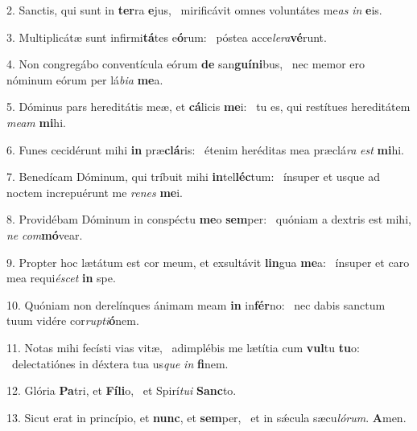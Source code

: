 2. Sanctis, qui sunt in \textbf{ter}ra \textbf{e}jus, \ast\  mirificávit omnes voluntátes me\textit{as} \textit{in} \textbf{e}is.\

3. Multiplicátæ sunt infirmi\textbf{tá}tes e\textbf{ó}rum: \ast\  póstea acce\textit{le}\textit{ra}\textbf{vé}runt.\

4. Non congregábo conventícula eórum \textbf{de} san\textbf{guí}\textbf{ni}bus, \ast\  nec memor ero nóminum eórum per lá\textit{bi}\textit{a} \textbf{me}a.\

5. Dóminus pars hereditátis meæ, et \textbf{cá}licis \textbf{me}i: \ast\  tu es, qui restítues hereditátem \textit{me}\textit{am} \textbf{mi}hi.\

6. Funes cecidérunt mihi \textbf{in} præ\textbf{clá}ris: \ast\  étenim heréditas mea præclá\textit{ra} \textit{est} \textbf{mi}hi.\

7. Benedícam Dóminum, qui tríbuit mihi \textbf{in}tel\textbf{léc}tum: \ast\  ínsuper et usque ad noctem increpuérunt me \textit{re}\textit{nes} \textbf{me}i.\

8. Providébam Dóminum in conspéctu \textbf{me}o \textbf{sem}per: \ast\  quóniam a dextris est mihi, \textit{ne} \textit{com}\textbf{mó}vear.\

9. Propter hoc lætátum est cor meum, et exsultávit \textbf{lin}gua \textbf{me}a: \ast\  ínsuper et caro mea requi\textit{é}\textit{scet} \textbf{in} spe.\

10. Quóniam non derelínques ánimam meam \textbf{in} in\textbf{fér}no: \ast\  nec dabis sanctum tuum vidére cor\textit{rup}\textit{ti}\textbf{ó}nem.\

11. Notas mihi fecísti vias vitæ, \dag\  adimplébis me lætítia cum \textbf{vul}tu \textbf{tu}o: \ast\  delectatiónes in déxtera tua us\textit{que} \textit{in} \textbf{fi}nem.\

12. Glória \textbf{Pa}tri, et \textbf{Fí}\textbf{li}o, \ast\  et Spirí\textit{tu}\textit{i} \textbf{Sanc}to.\

13. Sicut erat in princípio, et \textbf{nunc}, et \textbf{sem}per, \ast\  et in sǽcula sæcu\textit{ló}\textit{rum}. \textbf{A}men.\

